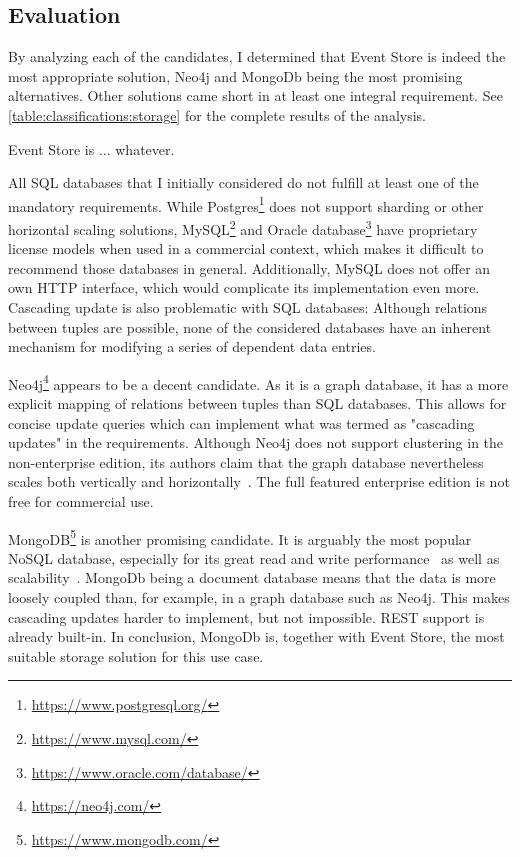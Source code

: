 \subsection{Evaluation}

By analyzing each of the candidates, I determined that Event Store is indeed the most appropriate solution, Neo4j and MongoDb being the most promising alternatives.
Other solutions came short in at least one integral requirement.
See \cref{table:classifications:storage} for the complete results of the analysis.

Event Store is ... whatever.

All \ac{SQL} databases that I initially considered do not fulfill at least one of the mandatory requirements.
While Postgres\footnote{\url{https://www.postgresql.org/}} does not support sharding or other horizontal scaling solutions, MySQL\footnote{\url{https://www.mysql.com/}} and Oracle database\footnote{\url{https://www.oracle.com/database/}} have proprietary license models when used in a commercial context, which makes it difficult to recommend those databases in general.
Additionally, MySQL does not offer an own HTTP interface, which would complicate its implementation even more.
Cascading update is also problematic with \ac{SQL} databases: Although relations between tuples are possible, none of the considered databases have an inherent mechanism for modifying a series of dependent data entries.

Neo4j\footnote{\url{https://neo4j.com/}} appears to be a decent candidate.
As it is a graph database, it has a more explicit mapping of relations between tuples than \ac{SQL} databases.
This allows for concise update queries which can implement what was termed as "cascading updates" in the requirements.
Although Neo4j does not support clustering in the non-enterprise edition, its authors claim that the graph database nevertheless scales both vertically and horizontally~\cite{...}.
The full featured enterprise edition is not free for commercial use.

MongoDB\footnote{\url{https://www.mongodb.com/}} is another promising candidate.
It is arguably the most popular NoSQL database, especially for its great read and write performance~\cite{6625441,...} as well as scalability~\cite{...}.
MongoDb being a document database means that the data is more loosely coupled than, for example, in a graph database such as Neo4j.
This makes cascading updates harder to implement, but not impossible.
\ac{REST} support is already built-in.
In conclusion, MongoDb is, together with Event Store, the most suitable storage solution for this use case.

